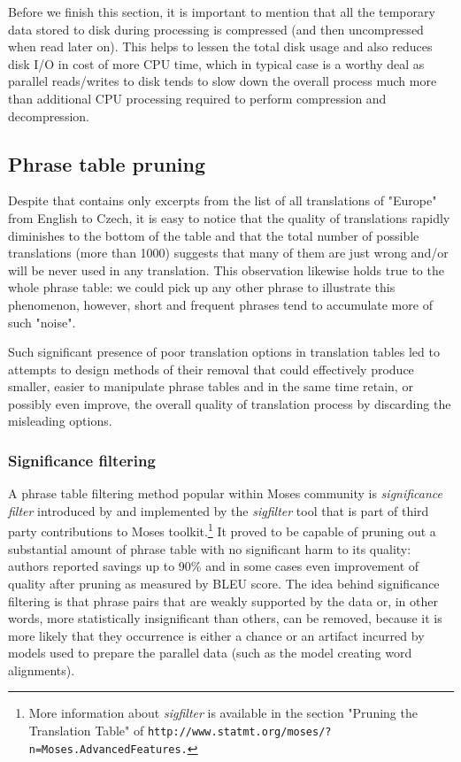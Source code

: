 Before we finish this section, it is important to mention that all
the temporary data stored to disk during processing is compressed
(and then uncompressed when read later on).
This helps to lessen the total disk usage and also reduces disk I/O in cost of
more CPU time, which in typical case is a worthy deal as parallel reads/writes
to disk tends to slow down the overall process much more than additional
CPU processing required to perform compression and decompression.

\subsection{Phrase table pruning}

Despite that  contains only excerpts from the list
of all translations of "Europe" from English to Czech, it is easy to notice
that the quality of translations rapidly diminishes to the bottom of the table
and that the total number of possible translations (more than 1000) suggests
that many of them are just wrong and/or will be never used in any translation.
This observation likewise holds true to the whole phrase table: we could pick up
any other phrase to illustrate this phenomenon, however, short and frequent
phrases tend to accumulate more of such "noise".

Such significant presence of poor translation options in translation tables led to
attempts to design methods of their removal that could effectively produce smaller,
easier to manipulate phrase tables and in the same time retain, or possibly even improve,
the overall quality of translation process by discarding the misleading options.

\subsubsection*{Significance filtering}

A phrase table filtering method popular within Moses community is \emph{significance filter}
introduced by \citet{johnson:sigfilter} and implemented by the \emph{sigfilter} tool
that is part of third party contributions to Moses toolkit.\footnote{More information
about \emph{sigfilter} is available in the section "Pruning the Translation Table" of
\tt{http://www.statmt.org/moses/?n=Moses.AdvancedFeatures}.}
It proved to be capable of pruning out a substantial amount of phrase table with no
significant harm to its quality: authors reported savings up to 90\% and in some cases
even improvement of quality after pruning as measured by BLEU score.
The idea behind significance filtering is that phrase pairs that are weakly supported
by the data or, in other words, more statistically insignificant than others, can be
removed, because it is more likely that they occurrence is either a chance or an artifact
incurred by models used to prepare the parallel data (such as the model creating word
alignments).

